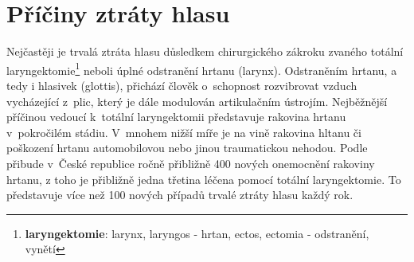 \section{Příčiny ztráty hlasu}
\label{chap:cause:desease}

Nejčastěji je trvalá ztráta hlasu důsledkem chirurgického zákroku zvaného
totální laryngektomie\footnote{\textbf{laryngektomie}: larynx, laryngos -
hrtan, ectos, ectomia - odstranění, vynětí} neboli úplné odstranění hrtanu (larynx).
Odstraněním hrtanu, a tedy i hlasivek (glottis), přichází člověk o~schopnost
rozvibrovat vzduch vycházející z~plic, který je dále modulován artikulačním
ústrojím. Nejběžnější příčinou vedoucí  k~totální laryngektomii představuje
rakovina hrtanu v~pokročilém stádiu. V~mnohem nižší míře je na vině rakovina
hltanu či poškození hrtanu automobilovou nebo jinou traumatickou nehodou.
Podle \cite{Slavicek2000} přibude v~České republice ročně přibližně 400 nových
onemocnění rakoviny hrtanu, z toho je přibližně jedna třetina léčena pomocí
totální laryngektomie. To představuje více než 100 nových případů trvalé
ztráty hlasu každý rok.




